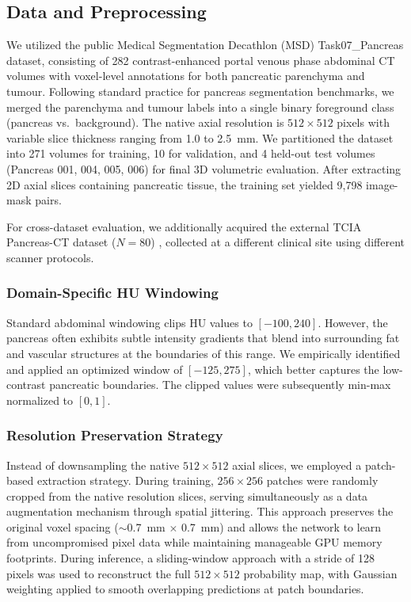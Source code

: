 \documentclass[journal, twocolumn]{IEEEtran}
\begin{document}
\subsection{Data and Preprocessing}
We utilized the public Medical Segmentation Decathlon (MSD) Task07\_Pancreas dataset, consisting of 282 contrast-enhanced portal venous phase abdominal CT volumes with voxel-level annotations for both pancreatic parenchyma and tumour. Following standard practice for pancreas segmentation benchmarks, we merged the parenchyma and tumour labels into a single binary foreground class (pancreas vs.\ background). The native axial resolution is $512 \times 512$ pixels with variable slice thickness ranging from 1.0 to 2.5~mm. We partitioned the dataset into 271 volumes for training, 10 for validation, and 4 held-out test volumes (Pancreas 001, 004, 005, 006) for final 3D volumetric evaluation. After extracting 2D axial slices containing pancreatic tissue, the training set yielded 9,798 image-mask pairs.

For cross-dataset evaluation, we additionally acquired the external TCIA Pancreas-CT dataset ($N=80$) \cite{tcia}, collected at a different clinical site using different scanner protocols.

\subsubsection{Domain-Specific HU Windowing}
Standard abdominal windowing clips HU values to $[-100, 240]$. However, the pancreas often exhibits subtle intensity gradients that blend into surrounding fat and vascular structures at the boundaries of this range. We empirically identified and applied an optimized window of $[-125, 275]$, which better captures the low-contrast pancreatic boundaries. The clipped values were subsequently min-max normalized to $[0, 1]$.

\subsubsection{Resolution Preservation Strategy}
Instead of downsampling the native $512 \times 512$ axial slices, we employed a patch-based extraction strategy. During training, $256 \times 256$ patches were randomly cropped from the native resolution slices, serving simultaneously as a data augmentation mechanism through spatial jittering. This approach preserves the original voxel spacing ($\sim$0.7~mm $\times$ 0.7~mm) and allows the network to learn from uncompromised pixel data while maintaining manageable GPU memory footprints. During inference, a sliding-window approach with a stride of 128 pixels was used to reconstruct the full $512 \times 512$ probability map, with Gaussian weighting applied to smooth overlapping predictions at patch boundaries.
\end{document}
